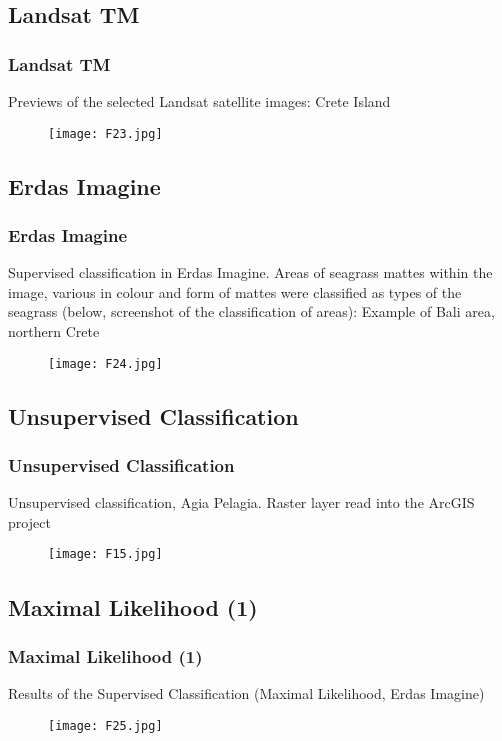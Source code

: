 \documentclass[pdflatex,compress]{beamer}
\begin{document}
\subsection{Landsat TM}
\begin{frame}\frametitle{Landsat TM}
\scriptsize{Previews of the selected Landsat satellite images: Crete Island}
\begin{figure}[H]
	\centering
		\texttt{[image: F23.jpg]}
\end{figure}
\end{frame}

\subsection{Erdas Imagine}
\begin{frame}\frametitle{Erdas Imagine}
\scriptsize{Supervised classification in Erdas Imagine. Areas of seagrass mattes within the image, various in colour and form of mattes were classified as types of the seagrass (below, screenshot of the classification of areas): Example of Bali area, northern Crete}
\begin{figure}[H]
	\centering
		\texttt{[image: F24.jpg]}
\end{figure}
\end{frame}

\subsection{Unsupervised Classification}
\begin{frame}\frametitle{Unsupervised Classification}
\scriptsize{Unsupervised classification, Agia Pelagia. Raster layer read into the ArcGIS project}
\begin{figure}[H]
	\centering
		\texttt{[image: F15.jpg]}
\end{figure}
\end{frame}

\subsection{Maximal Likelihood (1)}
\begin{frame}\frametitle{Maximal Likelihood (1)}
\scriptsize{Results of the Supervised Classification (Maximal Likelihood, Erdas Imagine)}
\begin{figure}[H]
	\centering
		\texttt{[image: F25.jpg]}
\end{figure}
\end{frame}
\end{document}
